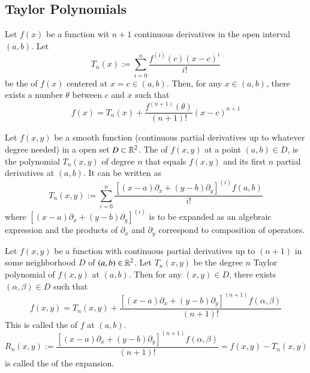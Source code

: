 \documentclass[12pt, a4paper, oneside, openright, titlepage]{book}
\begin{document}
\begin{appendices}
    
    \subsection{Taylor Polynomials}
    
    \begin{namthm}
        Let $f(x)$ be a function wit $n+1$ continuous derivatives in the open interval $(a,b)$. Let \begin{equation}
            T_n(x) := \sum\limits_{i=0}^n\frac{f^{(i)}(c)(x-c)^i}{i!}
        \end{equation}
        be the  of $f(x)$ centered at $x = c \in (a,b)$. Then, for any $x \in (a,b)$, there exists a number $\theta$ between $c$ and $x$ such that \begin{equation}
            f(x) = T_n(x) + \frac{f^{(n+1)}(\theta)}{(n+1)!}(x-c)^{n+1}
        \end{equation}
    \end{namthm}
    
    \begin{defn}
        Let $f(x,y)$ be a smooth function (continuous partial derivatives up to whatever degree needed) in a open set $D \subset \mathbb R^2$. The  of $f(x,y)$ at a point $(a,b) \in D$, is the polynomial $T_n(x,y)$ of degree $n$ that equals $f(x,y)$ and its first $n$ partial derivatives at $(a,b)$. It can be written as \begin{equation}
            T_n(x,y) := \sum\limits_{i=0}^n\frac{\left[(x-a)\partial_x + (y-b)\partial_y\right]^{(i)}f(a,b)}{i!}
        \end{equation}
        where $\left[(x-a)\partial_x + (y-b)\partial_y\right]^{(i)}$ is to be expanded as an algebraic expression and the products of $\partial_x$ and $\partial_y$ correspond to composition of operators.
    \end{defn}
    
    \begin{namthm}
        Let $f(x,y)$ be a function with continuous partial derivatives up to $(n+1)$ in some neighborhood $D$ of $(a,b) \in \mathbb R^2$. Let $T_n(x,y)$ be the degree $n$ Taylor polynomial of $f(x,y)$ at $(a,b)$. Then for any $(x,y) \in D$, there exists $(\alpha,\beta) \in D$ such that \begin{equation}
            f(x,y) = T_n(x,y) + \frac{\left[(x-a)\partial_x + (y-b)\partial_y\right]^{(n+1)}f(\alpha,\beta)}{(n+1)!}
        \end{equation}
        This is called the  of $f$ at $(a,b)$. \begin{equation}
            R_n(x,y) := \frac{\left[(x-a)\partial_x + (y-b)\partial_y\right]^{(n+1)}f(\alpha,\beta)}{(n+1)!} = f(x,y) - T_n(x,y)
        \end{equation}
        is called the  of the expansion.
    \end{namthm}
    

\end{appendices}
\end{document}
